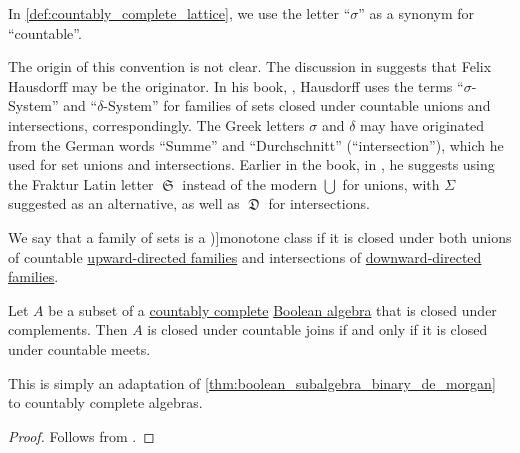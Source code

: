 \begin{remark}\label{rem:sigma_prefix_etymology}
  In \cref{def:countably_complete_lattice}, we use the letter \enquote{\( \sigma \)} as a synonym for \enquote{countable}.

  The origin of this convention is not clear. The discussion in \cite{MathOF:what_does_the_sigma_in_sigma_algebra_stand_for} suggests that Felix Hausdorff may be the originator. In his book, \cite[\S V.18]{Hausdorff1935Mengenlehre}, Hausdorff uses the terms \enquote{\( \sigma \)-System} and \enquote{\( \delta \)-System} for families of sets closed under countable unions and intersections, correspondingly. The Greek letters \( \sigma \) and \( \delta \) may have originated from the German words \enquote{Summe} and \enquote{Durchschnitt} (\enquote{intersection}), which he used for set unions and intersections. Earlier in the book, in \cite[\S I.3]{Hausdorff1962SetTheory}, he suggests using the Fraktur Latin letter \( \mfrakS \) instead of the modern \( \bigcup \) for unions, with \( \Sigma \) suggested as an alternative, as well as \( \mfrakD \) for intersections.
\end{remark}

\begin{definition}\label{def:monotone_class}
  We say that a family of sets is a \term[ru=монотонный класс, en=monotone class (\cite[27]{Halmos1976MeasureTheory})]{monotone class} if it is closed under both unions of countable \hyperref[def:directed_set]{upward-directed families} and intersections of \hyperref[def:directed_set]{downward-directed families}.
\end{definition}

\begin{lemma}\label{thm:boolean_subalgebra_countable_de_morgan}
  Let \( A \) be a subset of a \hyperref[def:countably_complete_lattice]{countably complete} \hyperref[def:boolean_algebra]{Boolean algebra} that is closed under complements. Then \( A \) is closed under countable joins if and only if it is closed under countable meets.
\end{lemma}
\begin{comments}
  \item This is simply an adaptation of \cref{thm:boolean_subalgebra_binary_de_morgan} to countably complete algebras.
\end{comments}
\begin{proof}
  Follows from .
\end{proof}

